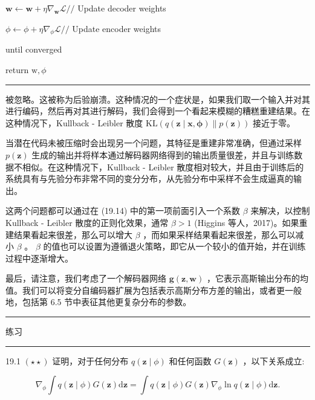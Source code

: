\documentclass[10pt]{article}
\newcommand{\HRule}{\begin{center}\rule{0.9\linewidth}{0.2mm}\end{center}}
\begin{document}
\hspace*{1em} \(\mathbf{w} \leftarrow  \mathbf{w} + \eta {\nabla }_{\mathbf{w}}\mathcal{L}//\) Update decoder weights

\hspace*{1em} \(\phi  \leftarrow  \phi  + \eta {\nabla }_{\phi }\mathcal{L}//\) Update encoder weights

until converged

return \(\mathrm{w},\phi\)

\HRule

被忽略。这被称为后验崩溃。这种情况的一个症状是，如果我们取一个输入并对其进行编码，然后再对其进行解码，我们会得到一个看起来模糊的糟糕重建结果。在这种情况下，Kullback - Leibler 散度 \(\mathrm{{KL}}\left( {q\left( {\mathbf{z} \mid  \mathbf{x},\mathbf{\phi }}\right) \parallel p\left( \mathbf{z}\right) }\right)\) 接近于零。

当潜在代码未被压缩时会出现另一个问题，其特征是重建非常准确，但通过采样 \(p\left( \mathbf{z}\right)\) 生成的输出并将样本通过解码器网络得到的输出质量很差，并且与训练数据不相似。在这种情况下，Kullback - Leibler 散度相对较大，并且由于训练后的系统具有与先验分布非常不同的变分分布，从先验分布中采样不会生成逼真的输出。

这两个问题都可以通过在 (19.14) 中的第一项前面引入一个系数 \(\beta\) 来解决，以控制 Kullback - Leibler 散度的正则化效果，通常 \(\beta  > 1\) (Higgins 等人，2017)。如果重建结果看起来很差，那么可以增大 \(\beta\) ，而如果采样结果看起来很差，那么可以减小 \(\beta\) 。 \(\beta\) 的值也可以设置为遵循退火策略，即它从一个较小的值开始，并在训练过程中逐渐增大。

最后，请注意，我们考虑了一个解码器网络 \(\mathbf{g}\left( {\mathbf{z},\mathbf{w}}\right)\) ，它表示高斯输出分布的均值。我们可以将变分自编码器扩展为包括表示高斯分布方差的输出，或者更一般地，包括第 6.5 节中表征其他更复杂分布的参数。

\HRule

练习

\HRule

19.1 \(\left( {\star  \star  }\right)\) 证明，对于任何分布 \(q\left( {\mathbf{z} \mid  \phi }\right)\) 和任何函数 \(G\left( \mathbf{z}\right)\) ，以下关系成立:

\[
{\nabla }_{\phi }\int q\left( {\mathbf{z} \mid  \phi }\right) G\left( \mathbf{z}\right) \mathrm{d}\mathbf{z} = \int q\left( {\mathbf{z} \mid  \phi }\right) G\left( \mathbf{z}\right) {\nabla }_{\phi }\ln q\left( {\mathbf{z} \mid  \phi }\right) \mathrm{d}\mathbf{z}. \tag{19.20}
\]
\end{document}
